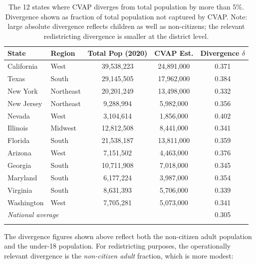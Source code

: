 \begin{longtable}{llccc}
\toprule
\textbf{State} & \textbf{Region} & \textbf{Total Pop (2020)} & \textbf{CVAP Est.} & \textbf{Divergence $\delta$} \\
\midrule
\endhead
California & West & 39,538,223 & 24,891,000 & 0.371 \\
Texas & South & 29,145,505 & 17,962,000 & 0.384 \\
New York & Northeast & 20,201,249 & 13,498,000 & 0.332 \\
New Jersey & Northeast & 9,288,994 & 5,982,000 & 0.356 \\
Nevada & West & 3,104,614 & 1,856,000 & 0.402 \\
Illinois & Midwest & 12,812,508 & 8,441,000 & 0.341 \\
Florida & South & 21,538,187 & 13,811,000 & 0.359 \\
Arizona & West & 7,151,502 & 4,463,000 & 0.376 \\
Georgia & South & 10,711,908 & 7,018,000 & 0.345 \\
Maryland & South & 6,177,224 & 3,987,000 & 0.354 \\
Virginia & South & 8,631,393 & 5,706,000 & 0.339 \\
Washington & West & 7,705,281 & 5,073,000 & 0.341 \\
\midrule
\multicolumn{4}{l}{\textit{National average}} & 0.305 \\
\bottomrule
\caption{The 12 states where CVAP diverges from total population by more than 5\%. Divergence shown as fraction of total population not captured by CVAP. Note: large absolute divergence reflects children as well as non-citizens; the relevant redistricting divergence is smaller at the district level.}
\label{tab:divergence}
\end{longtable}

\noindent The divergence figures shown above reflect both the non-citizen adult population and the under-18 population. For redistricting purposes, the operationally relevant divergence is the \emph{non-citizen adult} fraction, which is more modest:


